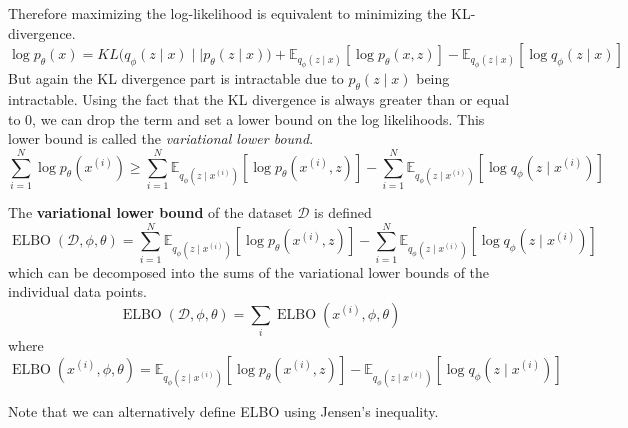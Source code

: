 \documentclass{article}
\DeclareMathOperator{\elbo}{ELBO}
\begin{document}
  Therefore maximizing the log-likelihood is equivalent to minimizing the KL-divergence. 
  \begin{equation}
    \log p_\theta (x) = KL \big( q_\phi (z \mid x) \mid\mid p_{\theta} (z \mid x) \big) + \mathbb{E}_{q_{\phi} (z \mid x)} [\log p_{\theta} (x, z)] - \mathbb{E}_{q_\phi(z \mid x)} [ \log q_{\phi} (z \mid x)]
  \end{equation}
  But again the KL divergence part is intractable due to $p_\theta (z \mid x)$ being intractable. Using the fact that the KL divergence is always greater than or equal to $0$, we can drop the term and set a lower bound on the log likelihoods. This lower bound is called the \textit{variational lower bound}.  
  \begin{equation}
    \sum_{i=1}^N \log p_{\theta} (x^{(i)}) \geq \sum_{i=1}^N \mathbb{E}_{q_\phi (z \mid x^{(i)})} [ \log p_{\theta} (x^{(i)}, z)] - \sum_{i=1}^N \mathbb{E}_{q_{\phi} (z \mid x^{(i)})} [ \log q_{\phi} (z \mid x^{(i)}) ]
  \end{equation} 

  \begin{definition}
    The \textbf{variational lower bound} of the dataset $\mathcal{D}$ is defined 
    \begin{equation}
      \elbo(\mathcal{D}, \phi, \theta) = \sum_{i=1}^N \mathbb{E}_{q_\phi (z \mid x^{(i)})} [ \log p_{\theta} (x^{(i)}, z)] - \sum_{i=1}^N \mathbb{E}_{q_{\phi} (z \mid x^{(i)})} [ \log q_{\phi} (z \mid x^{(i)})] 
    \end{equation}
    which can be decomposed into the sums of the variational lower bounds of the individual data points. 
    \begin{equation}
      \elbo(\mathcal{D}, \phi, \theta) = \sum_i \elbo(x^{(i)}, \phi, \theta) 
    \end{equation}
    where 
    \begin{equation}
      \elbo(x^{(i)}, \phi, \theta) = \mathbb{E}_{q_\phi (z \mid x^{(i)})} [ \log p_{\theta} (x^{(i)}, z)] - \mathbb{E}_{q_{\phi} (z \mid x^{(i)})} [ \log q_{\phi} (z \mid x^{(i)})] 
    \end{equation}
  \end{definition}

  Note that we can alternatively define ELBO using Jensen's inequality. 
\end{document}
